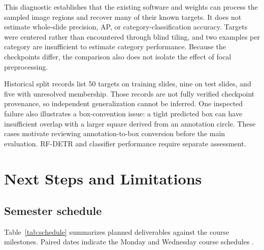 \documentclass[conference,letterpaper]{IEEEtran}
\begin{document}
This diagnostic establishes that the existing software and weights can process the sampled image regions and recover many of their known targets. It does not estimate whole-slide precision, AP, or category-classification accuracy. Targets were centered rather than encountered through blind tiling, and two examples per category are insufficient to estimate category performance. Because the checkpoints differ, the comparison also does not isolate the effect of focal preprocessing.

Historical split records list 50 targets on training slides, nine on test slides, and five with unresolved membership. Those records are not fully verified checkpoint provenance, so independent generalization cannot be inferred. One inspected failure also illustrates a box-convention issue: a tight predicted box can have insufficient overlap with a larger square derived from an annotation circle. These cases motivate reviewing annotation-to-box conversion before the main evaluation. RF-DETR and classifier performance require separate assessment.

\section{Next Steps and Limitations}
\subsection{Semester schedule}
Table~\ref{tab:schedule} summarizes planned deliverables against the course milestones. Paired dates indicate the Monday and Wednesday course schedules \cite{syllabus2026}.
\end{document}
